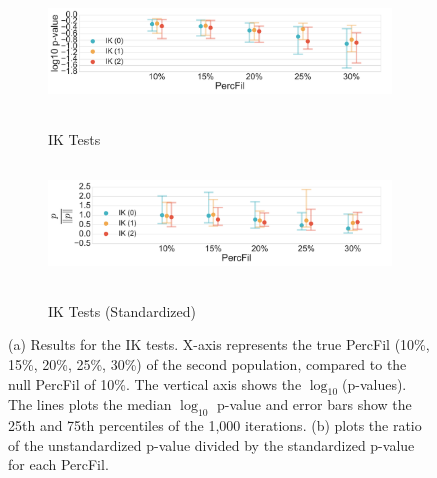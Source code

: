 \documentclass[12pt]{article}
\begin{document}
\begin{figure}[htp!]
  \centering
  \begin{subfigure}{.75\textwidth}
    \centering
    \caption{IK Tests}
    \includegraphics[height = 1.25in]{figure_8_contour_group.pdf}
    \label{fig:sub_contour}
  \end{subfigure}
  \begin{subfigure}{.75\textwidth}
    \centering
    \caption{IK Tests (Standardized)}
    \includegraphics[height = 1.25in]{figure_8_joint_contour_group.pdf}
    \label{fig:sub_contour_normed}
  \end{subfigure}
\label{fig:sub_contour_results}
\caption{(a) Results for the IK tests. X-axis represents the true PercFil (10\%, 15\%, 20\%, 25\%, 30\%) of the second population, compared to the null PercFil of 10\%. The vertical axis shows the $\log_{10}$(p-values). The lines plots the median $\log_{10}$ p-value and error bars show the 25th and 75th percentiles of the 1,000 iterations. (b) plots the ratio of the unstandardized p-value divided by the standardized p-value for each PercFil. }
\end{figure}
\end{document}
